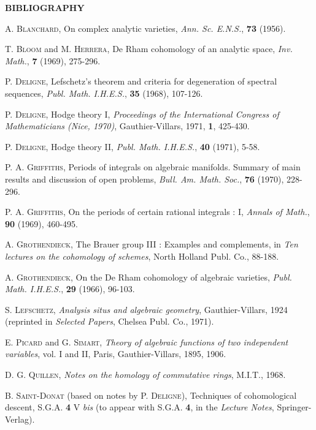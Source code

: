 \documentclass[11pt,leqno]{article}
\begin{document}
{\small
\begin{center}
\textbf{BIBLIOGRAPHY}
\end{center}

\noindent [1] A. \textsc{Blanchard}, On complex analytic varieties, \textit{Ann. Sc. E.N.S.}, \textbf{73} (1956).

\noindent [2] T. \textsc{Bloom} and M. \textsc{Herrera}, De Rham cohomology of an analytic space, \textit{Inv. Math.}, \textbf{7} (1969), 275-296.

\noindent [3] P. \textsc{Deligne}, Lefschetz's theorem and criteria for degeneration of spectral sequences, \textit{Publ. Math. I.H.E.S.}, \textbf{35} (1968), 107-126.

\noindent [4] P. \textsc{Deligne}, Hodge theory I, \textit{Proceedings of the International Congress of Mathematicians (Nice, 1970)}, Gauthier-Villars, 1971, \textbf{1}, 425-430.

\noindent [5] P. \textsc{Deligne}, Hodge theory II, \textit{Publ. Math. I.H.E.S.}, \textbf{40} (1971), 5-58.

\noindent [6] P. A. \textsc{Griffiths}, Periods of integrals on algebraic manifolds. Summary of main results and discussion of open problems, \textit{Bull. Am. Math. Soc.}, \textbf{76} (1970), 228-296.

\noindent [7] P. A. \textsc{Griffiths}, On the periods of certain rational integrals : I, \textit{Annals of Math.}, \textbf{90} (1969), 460-495.

\noindent [8] A. \textsc{Grothendieck}, The Brauer group III : Examples and complements, in \textit{Ten lectures on the cohomology of schemes}, North Holland Publ. Co., 88-188.

\noindent [9] A. \textsc{Grothendieck}, On the De Rham cohomology of algebraic varieties, \textit{Publ. Math. I.H.E.S.}, \textbf{29} (1966), 96-103.

\noindent [10] S. \textsc{Lefschetz}, \textit{Analysis situs and algebraic geometry}, Gauthier-Villars, 1924 (reprinted in \textit{Selected Papers}, Chelsea Publ. Co., 1971).

\noindent [11] E. \textsc{Picard} and G. \textsc{Simart}, \textit{Theory of algebraic functions of two independent variables}, vol. I and II, Paris, Gauthier-Villars, 1895, 1906.

\noindent [12] D. G. \textsc{Quillen}, \textit{Notes on the homology of commutative rings}, M.I.T., 1968.

\noindent [13] B. \textsc{Saint-Donat} (based on notes by P. \textsc{Deligne}), Techniques of cohomological descent, S.G.A. \textbf{4} V \textit{bis} (to appear with S.G.A. \textbf{4}, in the \textit{Lecture Notes}, Springer-Verlag).

}
\end{document}
